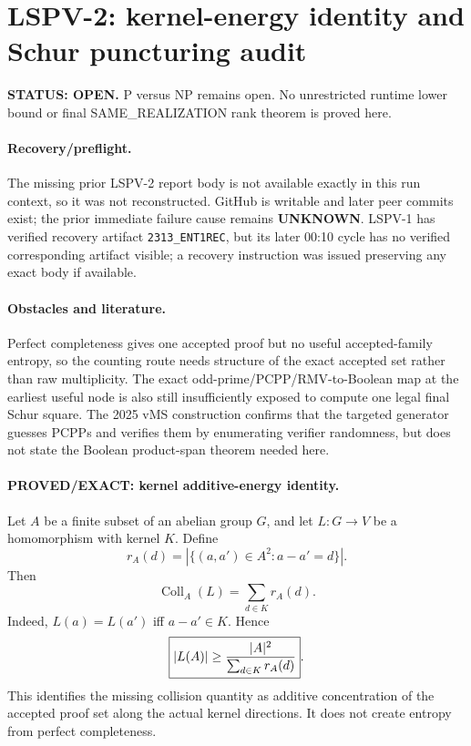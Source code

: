 \documentclass[11pt]{article}
\begin{document}
\section*{LSPV-2: kernel-energy identity and Schur puncturing audit}
\textbf{STATUS: OPEN.} P versus NP remains open. No unrestricted runtime lower bound or final SAME\_REALIZATION rank theorem is proved here.

\paragraph{Recovery/preflight.}
The missing prior LSPV-2 report body is not available exactly in this run context, so it was not reconstructed. GitHub is writable and later peer commits exist; the prior immediate failure cause remains \textbf{UNKNOWN}. LSPV-1 has verified recovery artifact \texttt{2313\_ENT1REC}, but its later 00:10 cycle has no verified corresponding artifact visible; a recovery instruction was issued preserving any exact body if available.

\paragraph{Obstacles and literature.}
Perfect completeness gives one accepted proof but no useful accepted-family entropy, so the counting route needs structure of the exact accepted set rather than raw multiplicity. The exact odd-prime/PCPP/RMV-to-Boolean map at the earliest useful node is also still insufficiently exposed to compute one legal final Schur square. The 2025 vMS construction confirms that the targeted generator guesses PCPPs and verifies them by enumerating verifier randomness, but does not state the Boolean product-span theorem needed here.

\paragraph{PROVED/EXACT: kernel additive-energy identity.}
Let \(A\) be a finite subset of an abelian group \(G\), and let \(L:G\to V\) be a homomorphism with kernel \(K\). Define
\[
r_A(d)=|\{(a,a')\in A^2:a-a'=d\}|.
\]
Then
\[
\boxed{\operatorname{Coll}_A(L)=\sum_{d\in K}r_A(d)}.
\]
Indeed, \(L(a)=L(a')\) iff \(a-a'\in K\). Hence
\[
\boxed{|L(A)|\ge {|A|^2\over \sum_{d\in K}r_A(d)}}.
\]
This identifies the missing collision quantity as additive concentration of the accepted proof set along the actual kernel directions. It does not create entropy from perfect completeness.
\end{document}
